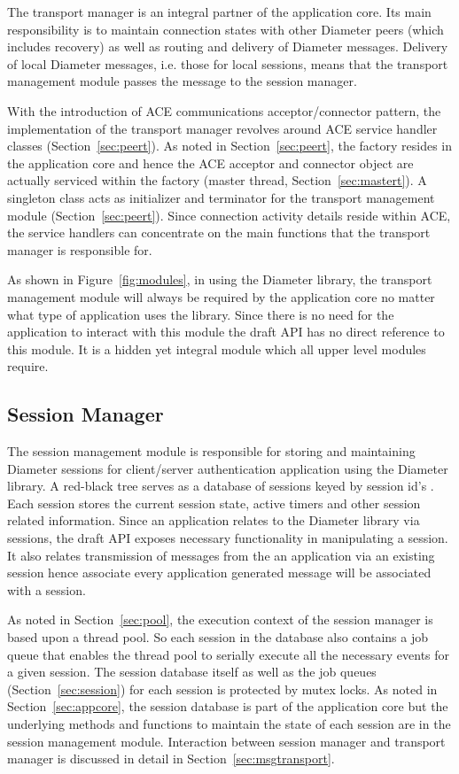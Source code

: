 \documentclass{article}
\begin{document}
The transport manager is an integral partner of the application
core. Its main responsibility is to maintain connection states with
other Diameter peers (which includes recovery) as well as routing and
delivery of Diameter messages. Delivery of local Diameter messages,
i.e. those for local sessions, means that the transport management
module passes the message to the session manager.

With the introduction of ACE communications acceptor/connector pattern,
the implementation of the transport manager revolves around ACE service
handler classes (Section~\ref{sec:peert}). As noted in
Section~\ref{sec:peert}, the factory resides in the application core and
hence the ACE acceptor and connector object are actually serviced within
the factory (master thread, Section~\ref{sec:mastert}). A singleton
class acts as initializer and terminator for the transport management
module (Section~\ref{sec:peert}). Since connection activity details
reside within ACE, the service handlers can concentrate on the main
functions that the transport manager is responsible for.

As shown in Figure~\ref{fig:modules}, in using the Diameter library, the
transport management module will always be required by the application
core no matter what type of application uses the library. Since there is
no need for the application to interact with this module the draft API
\cite{api} has no direct reference to this module. It is a hidden yet
integral module which all upper level modules require.

\subsection{Session Manager\label{sec:session}}

The session management module is responsible for storing and maintaining
Diameter sessions for client/server authentication application using the
Diameter library. A red-black tree serves as a database of sessions
keyed by session id's \cite{basep}. Each session stores the current
session state, active timers and other session related
information. Since an application relates to the Diameter library via
sessions, the draft API \cite{api} exposes necessary functionality in
manipulating a session. It also relates transmission of messages from
the an application via an existing session hence associate every
application generated message will be associated with a session.

As noted in Section~\ref{sec:pool}, the execution context of the
session manager is based upon a thread pool. So each session in the
database also contains a job queue that enables the thread pool to
serially execute all the necessary events for a given session. The
session database itself as well as the job queues
(Section~\ref{sec:session}) for each session is protected by mutex
locks. As noted in Section~\ref{sec:appcore}, the session database is
part of the application core but the underlying methods and functions to
maintain the state of each session are in the session management
module. Interaction between session manager and transport manager is
discussed in detail in Section~\ref{sec:msgtransport}.
\end{document}
